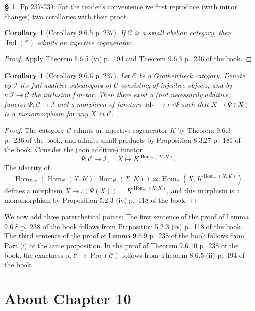 \documentclass[12pt]{article}%
\newtheorem{cor}[thm]{Corollary}
\theoremstyle{remark}
\theoremstyle{definition}
\newtheorem{s}[thm]{\S}%
\newcommand{\cc}{\mathcal}
\newcommand{\oo}{\operatorname}
\newcommand{\C}{\mathcal C}
\newcommand{\Set}{\mathbf{Set}}%
\DeclareMathOperator{\id}{id}
\DeclareMathOperator{\Hom}{Hom}%
\DeclareMathOperator{\Ind}{Ind}
\begin{document}
\begin{s}
Pp 237-239. For the reader's convenience we first reproduce (with minor changes) two corollaries with their proof. 

\begin{cor}[Corollary 9.6.5 p. 237]
If $\C$ is a small abelian category, then $\Ind(\C)$ admits an injective cogenerator.
\end{cor}

\begin{proof}
Apply Theorem 8.6.5 (vi) p.~194 and Theorem 9.6.3 p.~236 of the book.
\end{proof}

\begin{cor}[Corollary 9.6.6 p. 237]
Let $\C$ be a Grothendieck category. Denote by $\cc I$ the full additive subcategory of $\C$ consisting of injective objects, and by $\iota:\cc I\to\C$ the inclusion functor. Then there exist a (not necessarily additive) functor $\Psi:\C\to\cc I$ and a morphism of functors $\id_\C\to\iota\circ\Psi$ such that $X\to\Psi(X)$ is a monomorphism for any $X$ in $\C$.
\end{cor}

\begin{proof}
The category $\C$ admits an injective cogenerator $K$ by Theorem 9.6.3 p.~236 of the book, and admits small products by Proposition 8.3.27 p.~186 of the book. Consider the (non additive) functor 
$$
\Psi:\C\to\cc I,\quad X\mapsto K^{\Hom_\C(X,K)}.
$$ 
The identity of 
$$
\Hom_{\Set}(\Hom_\C(X,K),\Hom_\C(X,K))\simeq\Hom_\C(X,K^{\Hom_\C(X,K)})
$$ 
defines a morphism $X\to\iota(\Psi(X))=K^{\Hom_\C(X,K)}$, and this morphism is a monomorphism by Proposition 5.2.3 (iv) p.~118 of the book. 
\end{proof}

We now add three parenthetical points: The first sentence of the proof of Lemma 9.6.8 p.~238 of the book follows from Proposition 5.2.3 (iv) p.~118 of the book. The third sentence of the proof of Lemma 9.6.9 p.~238 of the book follows from Part (i) of the same proposition. In the proof of Theorem 9.6.10 p.~238 of the book, the exactness of $\C\to\oo{Pro}(\C)$ follows from Theorem 8.6.5 (ii) p.~194 of the book.
\end{s}


\section{About Chapter 10}
\end{document}

